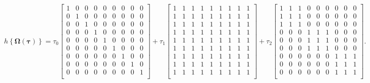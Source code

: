 \begin{equation}
h\left \{ \boldsymbol{\Omega}(\boldsymbol{\tau}) \right \} = 
\tau_0 \begin{bmatrix}
1 & 0 & 0 & 0 & 0 & 0 & 0 & 0 & 0\\ 
0 & 1 & 0 & 0 & 0 & 0 & 0 & 0 & 0\\ 
0 & 0 & 1 & 0 & 0 & 0 & 0 & 0 & 0\\ 
0 & 0 & 0 & 1 & 0 & 0 & 0 & 0 & 0\\ 
0 & 0 & 0 & 0 & 1 & 0 & 0 & 0 & 0\\ 
0 & 0 & 0 & 0 & 0 & 1 & 0 & 0 & 0\\ 
0 & 0 & 0 & 0 & 0 & 0 & 1 & 0 & 0\\ 
0 & 0 & 0 & 0 & 0 & 0 & 0 & 1 & 0\\ 
0 & 0 & 0 & 0 & 0 & 0 & 0 & 0 & 1\\ 
\end{bmatrix} + 
\tau_1 \begin{bmatrix}
1 & 1 & 1 & 1 & 1 & 1 & 1 & 1 & 1\\ 
1 & 1 & 1 & 1 & 1 & 1 & 1 & 1 & 1\\ 
1 & 1 & 1 & 1 & 1 & 1 & 1 & 1 & 1\\ 
1 & 1 & 1 & 1 & 1 & 1 & 1 & 1 & 1\\ 
1 & 1 & 1 & 1 & 1 & 1 & 1 & 1 & 1\\ 
1 & 1 & 1 & 1 & 1 & 1 & 1 & 1 & 1\\ 
1 & 1 & 1 & 1 & 1 & 1 & 1 & 1 & 1\\ 
1 & 1 & 1 & 1 & 1 & 1 & 1 & 1 & 1\\ 
1 & 1 & 1 & 1 & 1 & 1 & 1 & 1 & 1\\ 
\end{bmatrix} + 
\tau_2 \begin{bmatrix}
1 & 1 & 1 & 0 & 0 & 0 & 0 & 0 & 0\\ 
1 & 1 & 1 & 0 & 0 & 0 & 0 & 0 & 0\\ 
1 & 1 & 1 & 0 & 0 & 0 & 0 & 0 & 0\\ 
0 & 0 & 0 & 1 & 1 & 1 & 0 & 0 & 0\\ 
0 & 0 & 0 & 1 & 1 & 1 & 0 & 0 & 0\\ 
0 & 0 & 0 & 1 & 1 & 1 & 0 & 0 & 0\\ 
0 & 0 & 0 & 0 & 0 & 0 & 1 & 1 & 1\\ 
0 & 0 & 0 & 0 & 0 & 0 & 1 & 1 & 1\\ 
0 & 0 & 0 & 0 & 0 & 0 & 1 & 1 & 1\\ 
\end{bmatrix}.
\end{equation}

